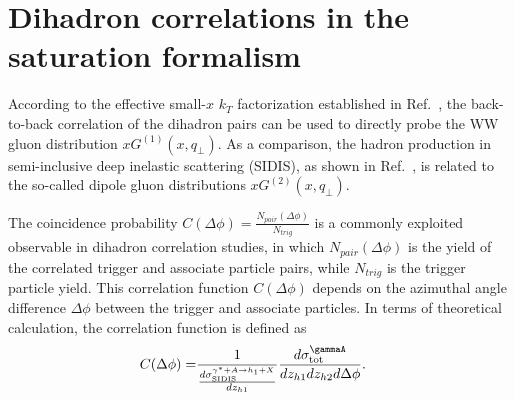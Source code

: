 \section{Dihadron correlations in the saturation formalism}\label{sec:dihadrontheory}

According to the effective small-$x$ $k_T$ factorization established in
Ref.~\cite{Dominguez:2011wm}, the
back-to-back correlation of the dihadron pairs can be used
to directly probe the WW gluon distribution $xG^{(1)}(x,q_{\perp})$. As a
comparison, the hadron production in semi-inclusive deep inelastic scattering
(SIDIS), as shown in Ref.~\cite{Marquet:2009ca}, is related to the so-called
dipole gluon distributions $xG^{(2)}(x,q_{\perp})$.

The coincidence probability $C(\Delta\phi)=\frac{N_{pair}(\Delta\phi)}{N_{trig}}$ is a
commonly exploited observable in dihadron correlation studies, in which
$N_{pair}(\Delta\phi)$ is the yield of the correlated trigger and associate
particle pairs, while $N_{trig}$ is the trigger particle yield. This
correlation function $C(\Delta\phi)$ depends on the azimuthal angle difference $\Delta\phi$
between the trigger and associate particles. In terms of theoretical
calculation, the correlation function is defined as
\begin{eqnarray} 
C(\Delta\phi) 
= & \frac{1}{\frac{d\sigma^{\gamma^{*}+A\rightarrow h_{1}+X}_{\textrm{SIDIS}}}{dz_{h1}}}
\frac{d\sigma^{\gammaA}_{\textrm{tot}}}{dz_{h1}dz_{h2}d\Delta\phi}.
\label{eqn:cdphiCGC} 
\end{eqnarray}

